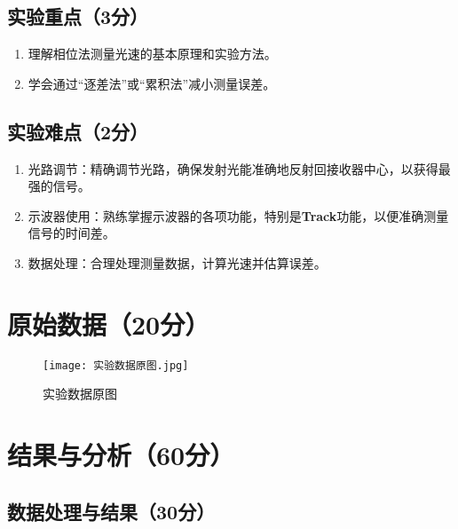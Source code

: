 \documentclass[]{../template/Report}%
\begin{document}
\subsection{实验重点（3分）}
\begin{enumerate}
    \item 理解相位法测量光速的基本原理和实验方法。

    \item 学会通过“逐差法”或“累积法”减小测量误差。
\end{enumerate}

\subsection{实验难点（2分）}
\begin{enumerate}
    \item 光路调节：精确调节光路，确保发射光能准确地反射回接收器中心，以获得最强的信号。

    \item 示波器使用：熟练掌握示波器的各项功能，特别是\textbf{Track}功能，以便准确测量信号的时间差。

    \item 数据处理：合理处理测量数据，计算光速并估算误差。
\end{enumerate}

\newpage


\section{原始数据（20分）}
\begin{figure}[H]
    \centering
    \texttt{[image: 实验数据原图.jpg]}
    \caption{实验数据原图}
    \label{fig:原始数据1}
\end{figure}


\section{结果与分析（60分）}
\subsection{数据处理与结果（30分）}
\end{document}
